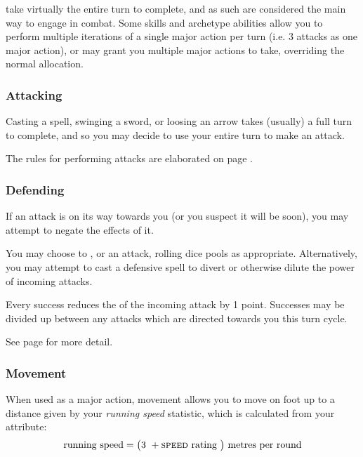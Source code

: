   take virtually the entire turn to complete, and as such are considered the main way to engage in combat. Some skills and archetype abilities allow you to perform multiple iterations of a single major action per turn (i.e. 3 attacks as one major action), or may grant you multiple major actions to take, overriding the normal allocation. 
 
 \subsubsection{Attacking}
 
 Casting a spell, swinging a sword, or loosing an arrow takes (usually) a full turn to complete, and so you may decide to use your entire turn to make an attack.
 
The rules for performing attacks are elaborated on page \pageref{S:Attacks}.


	\subsubsection{Defending}    
	
	If an attack is on its way towards you (or you suspect it will be soon), you may attempt to negate the effects of it. 
	
	You may choose to ,  or  an attack, rolling dice pools as appropriate. Alternatively, you may attempt to cast a defensive spell to divert or otherwise dilute the power of incoming attacks. 
	
	Every success reduces the  of the incoming attack by 1 point. Successes may be divided up between any attacks which are directed towards you this turn cycle. 
	
	See page \pageref{S:Defence} for more detail.
	
 \subsubsection{Movement}
 
 When used as a major action, movement allows you to move on foot up to a distance given by your {\it running speed} statistic, which is calculated from your  attribute:
\small
$$ \text{running speed} = \big(\text{3 } + \text{\textsc{speed} rating }\big) \text{ metres per round} $$  
\normalsize

